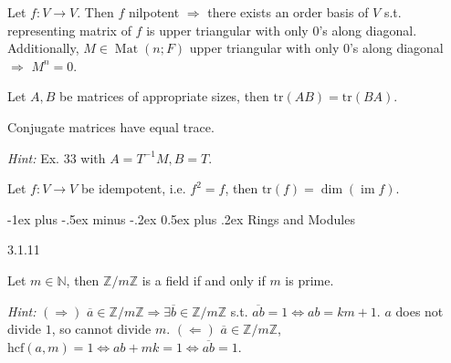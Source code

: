 \documentclass[10pt]{article} %
\makeatletter
\DeclareMathOperator{\im}{im}
\DeclareMathOperator{\Mat}{Mat}
\newcommand{\Hint}{\vspace{0.2em}\textit{Hint: }}
\renewcommand{\section}{\@startsection{section}{1}{0mm}%
                                {-1ex plus -.5ex minus -.2ex}%
                                {0.5ex plus .2ex}%
                                {\normalfont\large\bfseries}}
\makeatother
\begin{document}
\begin{multicols}{3}
\begin{exercise}{32}{}

    Let $f: V \to V$. Then $f$ nilpotent $\Rightarrow$ there exists an order basis of $V$ s.t. representing matrix of $f$ is upper triangular with only $0$'s along diagonal. Additionally, $M \in \Mat(n;F)$ upper triangular with only $0$'s along diagonal $\Rightarrow$ $M^n = 0$.

\end{exercise}

\begin{exercise}{33}{}

    Let $A,B$ be matrices of appropriate sizes, then $\mathrm{tr}(AB) = \mathrm{tr}(BA)$.

\end{exercise}

\begin{corollary}{33}{}

    Conjugate matrices have equal trace.

    \Hint Ex. 33 with $A=T^{-1}M,B=T$.

\end{corollary}

\begin{exercise}{35}{}

    Let $f: V \to V$ be idempotent, i.e. $f^2 = f$, then $\mathrm{tr}(f) = \dim{(\im{f})}$.

\end{exercise}


\section{Rings and Modules}

\begin{proposition}{3.1.11}{}

    Let $m \in \mathbb{N}$, then $\mathbb{Z}/m\mathbb{Z}$ is a field if and only if $m$ is prime.

    \Hint $(\!\Rightarrow\!)$ $\overline{a} \in \mathbb{Z}/m\mathbb{Z} \Rightarrow \exists \overline{b} \in \mathbb{Z}/m\mathbb{Z}$ s.t. $\overline{ab} = 1 \Leftrightarrow ab = km + 1$. $a$ does not divide $1$, so cannot divide $m$. $(\Longleftarrow)$ $\overline{a} \in \mathbb{Z}/m\mathbb{Z}$, $\mathrm{hcf}(a,m)=1 \Leftrightarrow ab + mk = 1 \Leftrightarrow \overline{ab} = 1$.


\end{proposition}
\end{multicols}
\end{document}
